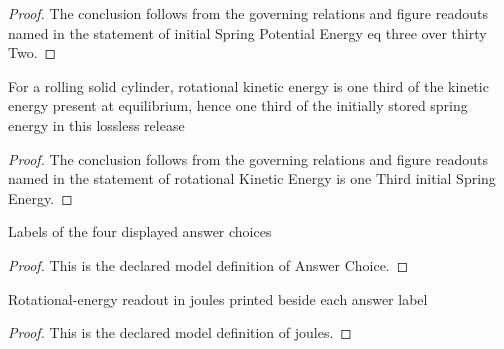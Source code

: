 \begin{proof}
  The conclusion follows from the governing relations and figure readouts named in the statement of initial Spring Potential Energy eq three over thirty Two.
\end{proof}
\begin{lemma}
  \label{lem:physics:phyx-mini-0279:phyxminiproblems-problemphyxmini0279-rotationalkineticenergy-is-onethird-initialspringenergy}
  For a rolling solid cylinder, rotational kinetic energy is one third of the kinetic energy present at equilibrium, hence one third of the initially stored spring energy in this lossless release
\end{lemma}
\begin{proof}
  The conclusion follows from the governing relations and figure readouts named in the statement of rotational Kinetic Energy is one Third initial Spring Energy.
\end{proof}
\begin{definition}
  \label{def:physics:phyx-mini-0279:phyxminiproblems-problemphyxmini0279-answerchoice}
  Labels of the four displayed answer choices
\end{definition}
\begin{proof}
  This is the declared model definition of Answer Choice.
\end{proof}
\begin{definition}[joules]
  \label{def:physics:phyx-mini-0279:phyxminiproblems-problemphyxmini0279-answerchoice-joules}
  Rotational-energy readout in joules printed beside each answer label
\end{definition}
\begin{proof}
  This is the declared model definition of joules.
\end{proof}
